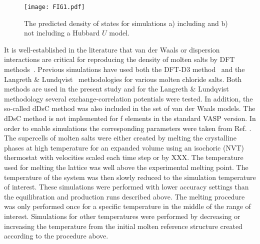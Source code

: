 \documentclass[preprint,3p,10pt,twocolumn,number,sort&compress]{elsarticle}
\begin{document}
\begin{figure}[htb]
\centering
\texttt{[image: FIG1.pdf]}
\caption{The predicted density of states for simulations a) including and b) not including a Hubbard $U$ model.} 
\label{fig:DOS}
\end{figure}

It is well-established in the literature that van der Waals or dispersion interactions are critical for reproducing the density of molten salts by DFT methods~\cite{}. Previous simulations have used both the DFT-D3 method~\cite{} and the Langreth \& Lundqvist~\cite{} methodologies for various molten chloride salts. Both methods are used in the present study and for the Langreth \& Lundqvist~\cite{}  methodology several exchange-correlation potentials were tested. In addition, the so-called dDsC method was also included in the set of van der Waals models. The dDsC method is not implemented for f elements in the standard VASP version. In order to enable simulations the corresponding parameters were taken from Ref. \cite{}. The supercells of molten salts were either created by melting the crystalline phases at high temperature for an expanded volume using an isochoric (NVT) thermostat with velocities scaled each time step or by XXX. The temperature used for melting the lattice was well above the experimental melting point. The temperature of the system was then slowly reduced to the simulation temperature of interest. These simulations were performed with lower accuracy settings than the equilibration and production runs described above. The melting procedure was only performed once for a specific temperature in the middle of the range of interest. Simulations for other temperatures were performed by decreasing or increasing the temperature from the initial molten reference structure created according to the procedure above.
\end{document}
